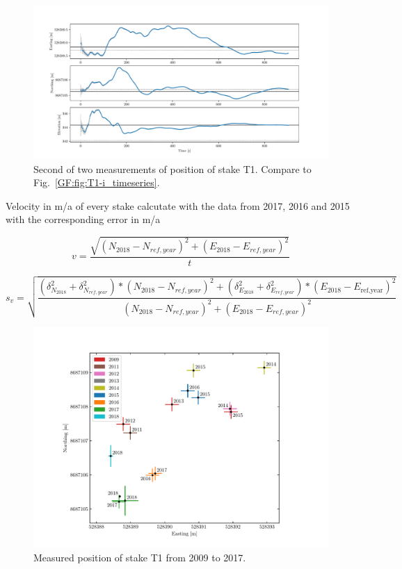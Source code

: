\begin{figure}[H]
    \centering
    \includegraphics[width=\textwidth]{./figs/timeseries/46250723_corr-T1-ii-2017_Timeseries-east-north-elev.pdf}
    \caption{Second of two measurements of position of stake T1. Compare to Fig.~\ref{GF:fig:T1-i_timeseries}.}
    \label{GF:fig:T1-ii_timeseries}
\end{figure}





\begin{table}[h]
	\caption{Velocity in m/a of every stake calcutate with the data from 2017, 2016 and 2015 with the corresponding error in m/a}
	\centering
	\scriptsize
	
	\label{GPS:tab:os_tab}
\end{table}

\begin{equation}
v = \frac{\sqrt{(N_{2018}-N_{ref,year})^2+(E_{2018} - E_{ref,year})^2}}{t}
\end{equation}

\begin{equation}
s_v = \sqrt{\frac{(\delta_{N_{2018}}^2 + \delta_{N_{ref,year}}^2) * (N_{2018}-N_{ref,year})^2 +
(\delta_{E_{2018}}^2 + \delta_{E_{ref,year}}^2) * (E_{2018}-E_{\text{ref,year}})^2}
{(N_{2018} - N_{ref,year})^2+ (E_{2018} - E_{ref,year})^2}}
\end{equation}

\begin{figure}[H]
    \centering
    \includegraphics[width=\textwidth]{./figs/T1_2d.pdf}
    \caption{Measured position of stake T1 from 2009 to 2017.}
    \label{GF:fig:T1_2d}
\end{figure}

